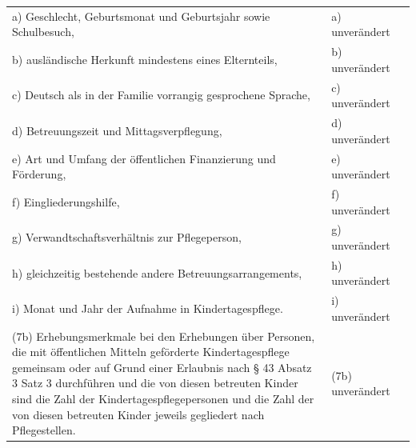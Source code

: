 \documentclass[10pt,a4paper,landscape]{article}
\begin{document}
\begin{longtable}{|L{8.2cm}|L{8.2cm}|L{8.2cm}|}
\hhline{|---|}
a)   \newline Geschlecht, Geburtsmonat und  \newline Geburtsjahr sowie Schulbesuch, & a) unverändert &  \\
\hhline{|---|}
b)   \newline ausländische Herkunft mindestens eines  \newline Elternteils, & b) unverändert &  \\
\hhline{|---|}
c)   \newline Deutsch als in der Familie vorrangig  \newline gesprochene Sprache, & c) unverändert &  \\
\hhline{|---|}
d)   \newline Betreuungszeit und Mittagsverpflegung, & d) unverändert &  \\
\hhline{|---|}
e)   \newline Art und Umfang der öffentlichen  \newline Finanzierung und Förderung, & e) unverändert &  \\
\hhline{|---|}
f)   \newline Eingliederungshilfe, & f) unverändert &  \\
\hhline{|---|}
g)   \newline Verwandtschaftsverhältnis zur  \newline Pflegeperson, & g) unverändert &  \\
\hhline{|---|}
h)   \newline gleichzeitig bestehende andere  \newline Betreuungsarrangements, & h) unverändert &  \\
\hhline{|---|}
i)   \newline Monat und Jahr der Aufnahme in  \newline Kindertagespflege. & i) unverändert &  \\
\hhline{|---|}
(7b) Erhebungsmerkmale bei den  \newline Erhebungen über Personen, die mit  \newline öffentlichen Mitteln geförderte  \newline Kindertagespflege gemeinsam oder auf  \newline Grund einer Erlaubnis nach \S{} 43 Absatz 3  \newline Satz 3 durchführen und die von diesen  \newline betreuten Kinder sind die Zahl der  \newline Kindertagespflegepersonen und die Zahl  \newline der von diesen betreuten Kinder jeweils  \newline gegliedert nach Pflegestellen. & (7b) unverändert &  \\

\end{longtable}
\end{document}
